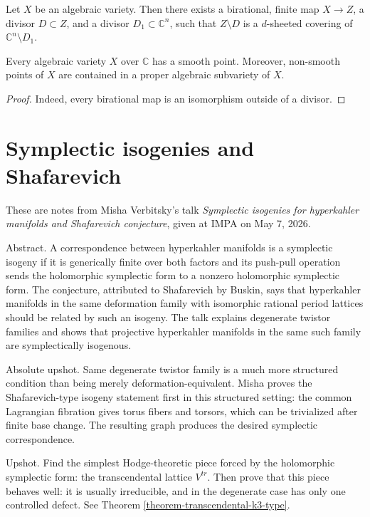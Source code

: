 \begin{corollary}
\label{lemma-birational-finite-map-to-covering}
Let $X$ be an algebraic variety. Then there
exists a birational, finite map
$X \to Z$, a divisor $D \subset Z$, and a
divisor $D_1 \subset \mathbb{C}^n$, such
that $Z \setminus D$ is a $d$-sheeted
covering of $\mathbb{C}^n \setminus D_1$.
\end{corollary}

\begin{corollary}
\label{lemma-algebraic-variety-smooth-point}
Every algebraic variety $X$ over $\mathbb{C}$
has a smooth point. Moreover, non-smooth
points of $X$ are contained in a proper
algebraic subvariety of $X$.
\end{corollary}

\begin{proof}
Indeed, every birational map is an
isomorphism outside of a divisor.
\end{proof}


\section{Symplectic isogenies and
Shafarevich}
\label{section-symplectic-isogenies-shaf}

These are notes from Misha Verbitsky's talk
{\it Symplectic isogenies for hyperkahler
manifolds and Shafarevich conjecture},
given at IMPA on May 7, 2026.

\medskip
Abstract.
A correspondence between hyperkahler
manifolds is a symplectic isogeny if it is
generically finite over both factors and its
push-pull operation sends the holomorphic
symplectic form to a nonzero holomorphic
symplectic form.
The conjecture, attributed to Shafarevich by
Buskin, says that hyperkahler manifolds in
the same deformation family with isomorphic
rational period lattices should be related
by such an isogeny.
The talk explains degenerate twistor
families and shows that projective
hyperkahler manifolds in the same such
family are symplectically isogenous.

\medskip
Absolute upshot.
Same degenerate twistor family is a much
more structured condition than being merely
deformation-equivalent.
Misha proves the Shafarevich-type isogeny
statement first in this structured setting:
the common Lagrangian fibration gives torus
fibers and torsors, which can be trivialized
after finite base change.
The resulting graph produces the desired
symplectic correspondence.

\medskip
Upshot.
Find the simplest Hodge-theoretic piece
forced by the holomorphic symplectic form:
the transcendental lattice $V^{tr}$.
Then prove that this piece behaves well:
it is usually irreducible, and in the
degenerate case has only one controlled
defect.
See Theorem
\ref{theorem-transcendental-k3-type}.

